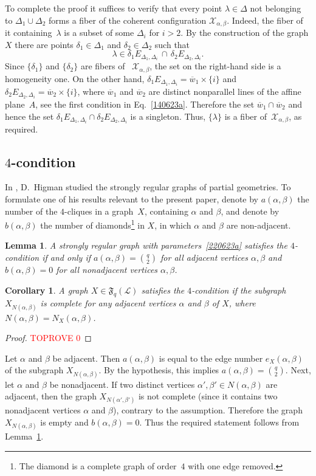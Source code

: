 \documentclass{amsart}
\newcommand{\cal}{\mathcal}
\newtheorem{corollary}[formula]{Corollary}
\newtheorem{lemma}[formula]{Lemma}
\def\lmml#1{\begin{lemma}\label{#1}}
\def\elmm{\end{lemma}}
\def\crllrl#1{\begin{corollary}\label{#1}}
\def\ecrllr{\end{corollary}}
\def\prf{\begin{proof}\textcolor{red}{TOPROVE 0}\end{proof}}
\def\cL{{\cal L}}
\def\cX{{\cal X}}
\def\fF{{\mathfrak F}}
\def\ov{\overline}
\begin{document}
To complete the proof it suffices to verify that every point $\lambda\in\Delta$ not belonging to $\Delta_1\cup\Delta_2$ 
 forms a fiber of the coherent configuration $\cX_{\alpha,\beta}$. Indeed, the fiber of it containing~$\lambda$ is a subset of some  $\Delta_i$ for $i>2$.    By the construction of the graph $X$ there are  points $\delta_1\in\Delta_1$ and $\delta_2\in\Delta_2$ such that 
$$
\lambda\in \delta_1 E_{\Delta_1,\Delta_i}\,\cap\,  \delta_2 E_{\Delta_2,\Delta_i}.
$$
Since $\{\delta_1\}$ and $\{\delta_2\}$  are fibers of~ $\cX_{\alpha,\beta}$, the set  on the right-hand side  is a homogeneity one. On the other hand, $\delta_1 E_{\Delta_1,\Delta_i}=\ov w_1\times \{i\}$ and~$\delta_2 E_{\Delta_2,\Delta_i}=\ov w_2\times \{i\}$, where $\ov w_1$ and $\ov w_2$ are distinct nonparallel lines of the affine plane~$A$, see the first condition in Eq.~\eqref{140623a}. Therefore the set $\ov w_1\cap\ov w_2$ and hence the set $\delta_1 E_{\Delta_1,\Delta_i}\cap \delta_2 E_{\Delta_2,\Delta_i}$ is a singleton. Thus, $\{\lambda\}$ is a fiber of~$\cX_{\alpha,\beta}$, as required.
\eprf



\subsection{$4$-condition}
In \cite {Higman1971}, D.~Higman studied the strongly regular graphs of partial geometries.  To formulate one of his results relevant to the present paper, denote by $a(\alpha,\beta)$ the number of the $4$-cliques in a graph~$X$, containing $\alpha$ and $\beta$, and denote by $b(\alpha,\beta)$  the number of diamonds\footnote{The diamond is a complete graph of order~$4$ with one edge removed.} in $X$, in which $\alpha$ and $\beta$ are non-adjacent. 

\lmml{110723a}{\rm \cite[Propositions~6.3 and~6.6(2)]{Higman1971}}
A strongly regular graph with parameters~\eqref{220623a} satisfies the $4$-condition if  and only if $a(\alpha,\beta)=\binom{q}{2}$ for all adjacent vertices $\alpha,\beta$ and $b(\alpha,\beta)=0$ for all nonadjacent vertices $\alpha,\beta$.
\elmm


\crllrl{060623a}
A graph   $X\in\fF_q(\cL)$ satisfies the $4$-condition if the subgraph $X_{N(\alpha,\beta)}$ is complete for any adjacent vertices $\alpha$ and $\beta$ of $X$, where $N(\alpha,\beta)=N_X(\alpha,\beta)$.
\ecrllr
\prf
Let $\alpha$ and $\beta$ be adjacent. Then $a(\alpha,\beta)$ is equal to the edge number $e_X(\alpha,\beta)$ of the subgraph  $X_{N(\alpha,\beta)}$. By the hypothesis, this implies $a(\alpha,\beta)=\binom{q}{2}$. Next, let $\alpha$ and $\beta$ be nonadjacent.  If two distinct vertices $\alpha',\beta'\in N(\alpha,\beta)$ are adjacent, then the graph $X_{N(\alpha',\beta')}$ is not complete (since it contains two nonadjacent vertices $\alpha$ and $\beta$), contrary to the assumption. Therefore the graph  $X_{N(\alpha,\beta)}$ is empty and $b(\alpha,\beta)=0$. Thus the required statement follows from Lemma~\ref{110723a}.
\eprf
\end{document}
